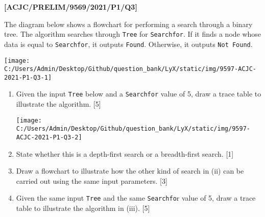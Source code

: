 \item \textbf{{[}ACJC/PRELIM/9569/2021/P1/Q3{]} }

The diagram below shows a flowchart for performing a search through
a binary tree. The algorithm searches through \texttt{Tree} for \texttt{Searchfor}.
If it finds a node whose data is equal to \texttt{Searchfor}, it outputs
\texttt{Found}. Otherwise, it outputs \texttt{Not Found}.
\noindent \begin{center}
\texttt{[image: C:/Users/Admin/Desktop/Github/question\_bank/LyX/static/img/9597-ACJC-2021-P1-Q3-1]}\quad{}
\par\end{center}
\begin{enumerate}
\item Given the input \texttt{Tree} below and a \texttt{Searchfor} value
of 5, draw a trace table to illustrate the algorithm. \hfill{} {[}5{]}
\noindent \begin{center}
\texttt{[image: C:/Users/Admin/Desktop/Github/question\_bank/LyX/static/img/9597-ACJC-2021-P1-Q3-2]}\quad{}
\par\end{center}
\item State whether this is a depth-first search or a breadth-first search.
\hfill{} {[}1{]}
\item Draw a flowchart to illustrate how the other kind of search in (ii)
can be carried out using the same input parameters. \hfill{} {[}3{]}
\item Given the same input \texttt{Tree} and the same \texttt{Searchfo}r
value of 5, draw a trace table to illustrate the algorithm in (iii).
\hfill{} {[}5{]}
\end{enumerate}
